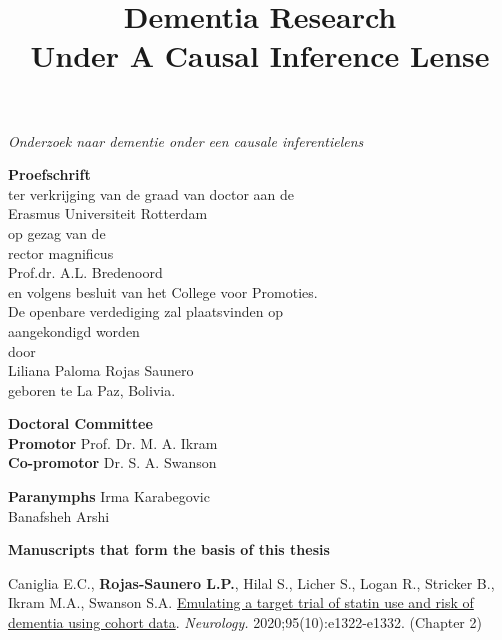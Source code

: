 \thispagestyle{empty}
\begin{center}
\title{\textbf{\Large Dementia Research \\ Under A Causal Inference Lense}}

\textit{\large Onderzoek naar dementie onder een causale inferentielens}

\vspace{10mm}
\textbf{\large{Proefschrift}}\\
\vspace{10mm}
ter verkrijging van de graad van doctor aan de\\
Erasmus Universiteit Rotterdam\\
op gezag van de\\
rector magnificus\\
\vspace{10mm}
Prof.dr. A.L. Bredenoord\\
\vspace{10mm}
en volgens besluit van het College voor Promoties.\\
De openbare verdediging zal plaatsvinden op\\
aangekondigd worden\\
\vspace{10mm}
door\\
\vspace{10mm}
Liliana Paloma Rojas Saunero\\
geboren te La Paz, Bolivia. 
\end{center}


 

\newpage
\thispagestyle{empty}
\textbf{Doctoral Committee} \\
\textbf{Promotor}\phantom{mbersa:}     Prof. Dr. M. A. Ikram   \\ 
\textbf{Co-promotor} \phantom{er::} Dr. S. A. Swanson  

\vspace*{\fill}
 
\textbf{Paranymphs }    Irma Karabegovic   \\ 
\phantom{Paranymphs ab} Banafsheh Arshi    
                    
\newpage  
\thispagestyle{empty}
\textbf{Manuscripts that form the basis of this thesis}

Caniglia E.C., \textbf{Rojas-Saunero L.P.}, Hilal S., Licher S., Logan
R., Stricker B., Ikram M.A., Swanson S.A.
\href{https://pubmed.ncbi.nlm.nih.gov/32753444/}{Emulating a target
trial of statin use and risk of dementia using cohort data}.
\emph{Neurology.} 2020;95(10):e1322-e1332. (Chapter 2)

